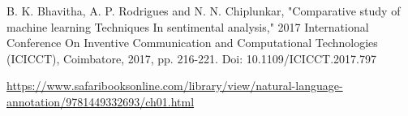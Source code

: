 \documentclass[12pt]{article}
\begin{document}
\begin{thebibliography}{99}
B. K. Bhavitha, A. P. Rodrigues and N. N. Chiplunkar, "Comparative study of machine learning Techniques In sentimental analysis," 2017 International Conference On Inventive Communication and Computational Technologies (ICICCT), Coimbatore, 2017, pp. 216-221. Doi: 10.1109/ICICCT.2017.797\par

\href{https://www.safaribooksonline.com/library/view/natural-language-annotation/9781449332693/ch01.html}{https://www.safaribooksonline.com/library/view/natural-language-annotation/9781449332693/ch01.html}\par


\vspace{\baselineskip}
\setlength{\parskip}{9.96pt}

\end{thebibliography}

\vspace{\baselineskip}
\end{document}
